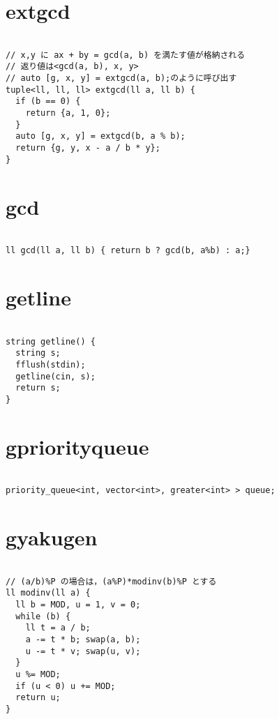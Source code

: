 \documentclass[a4j,titlepage]{jarticle} %
\begin{document}
\color{white}
\section{extgcd}
\color{black}
\begin{lstlisting}[caption=extgcd]

// x,y に ax + by = gcd(a, b) を満たす値が格納される
// 返り値は<gcd(a, b), x, y>
// auto [g, x, y] = extgcd(a, b);のように呼び出す
tuple<ll, ll, ll> extgcd(ll a, ll b) {
  if (b == 0) {
    return {a, 1, 0};
  }
  auto [g, x, y] = extgcd(b, a % b);
  return {g, y, x - a / b * y};
}

\end{lstlisting}

\color{white}
\section{gcd}
\color{black}
\begin{lstlisting}[caption=gcd]

ll gcd(ll a, ll b) { return b ? gcd(b, a%b) : a;}

\end{lstlisting}

\color{white}
\section{getline}
\color{black}
\begin{lstlisting}[caption=getline]

string getline() {
  string s;
  fflush(stdin);
  getline(cin, s);
  return s;
}

\end{lstlisting}

\color{white}
\section{gpriorityqueue}
\color{black}
\begin{lstlisting}[caption=gpriorityqueue]

priority_queue<int, vector<int>, greater<int> > queue;

\end{lstlisting}

\color{white}
\section{gyakugen}
\color{black}
\begin{lstlisting}[caption=gyakugen]

// (a/b)%P の場合は，(a%P)*modinv(b)%P とする
ll modinv(ll a) {
  ll b = MOD, u = 1, v = 0;
  while (b) {
    ll t = a / b;
    a -= t * b; swap(a, b);
    u -= t * v; swap(u, v);
  }
  u %= MOD;
  if (u < 0) u += MOD;
  return u;
}

\end{lstlisting}
\end{document}
